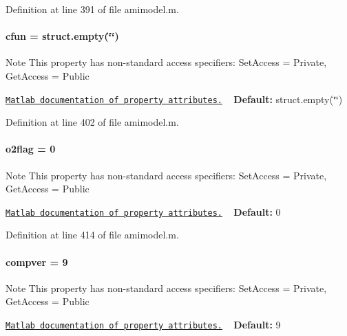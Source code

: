 Definition at line 391 of file amimodel.\+m.

\hypertarget{classamimodel_afec809c626a350367485aa6aaea6b585}{}
\paragraph[{cfun}]{\setlength{\rightskip}{0pt plus 5cm}cfun = struct.\+empty(\char`\"{}\char`\"{})}\label{classamimodel_afec809c626a350367485aa6aaea6b585}
\begin{DoxyNote}{Note}
This property has non-\/standard access specifiers\+: {\ttfamily Set\+Access = Private, Get\+Access = Public} 

\href{http://www.mathworks.com/help/matlab/matlab_oop/property-attributes.html}{\tt Matlab documentation of property attributes.} ~\newline
{\bfseries Default\+:} struct.\+empty(\char`\"{}\char`\"{}) 
\end{DoxyNote}


Definition at line 402 of file amimodel.\+m.

\hypertarget{classamimodel_a2b89e3b4e249878a2d436ee337952c4f}{}
\paragraph[{o2flag}]{\setlength{\rightskip}{0pt plus 5cm}o2flag = 0}\label{classamimodel_a2b89e3b4e249878a2d436ee337952c4f}
\begin{DoxyNote}{Note}
This property has non-\/standard access specifiers\+: {\ttfamily Set\+Access = Private, Get\+Access = Public} 

\href{http://www.mathworks.com/help/matlab/matlab_oop/property-attributes.html}{\tt Matlab documentation of property attributes.} ~\newline
{\bfseries Default\+:} 0 
\end{DoxyNote}


Definition at line 414 of file amimodel.\+m.

\hypertarget{classamimodel_a0a9e4caf628a02e6db68e91c2de6f382}{}
\paragraph[{compver}]{\setlength{\rightskip}{0pt plus 5cm}compver = 9}\label{classamimodel_a0a9e4caf628a02e6db68e91c2de6f382}
\begin{DoxyNote}{Note}
This property has non-\/standard access specifiers\+: {\ttfamily Set\+Access = Private, Get\+Access = Public} 

\href{http://www.mathworks.com/help/matlab/matlab_oop/property-attributes.html}{\tt Matlab documentation of property attributes.} ~\newline
{\bfseries Default\+:} 9 
\end{DoxyNote}


